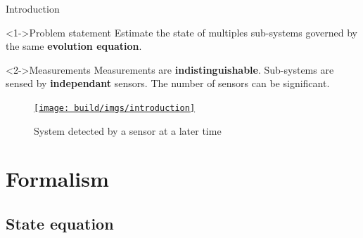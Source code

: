 \documentclass{beamer}
\begin{document}
            \begin{frame}{Introduction}
                \begin{minipage}{0.55\textwidth}
                    \begin{block}<1->{Problem statement}
                        Estimate the state of multiples sub-systems governed by the same \textbf{evolution equation}.
                    \end{block}
                    \begin{block}<2->{Measurements}
                        Measurements are \textbf{indistinguishable}. Sub-systems are sensed by \textbf{independant} sensors. The number of sensors can be significant.
                    \end{block}
                \end{minipage}
                \hfill
                \begin{minipage}{0.4\textwidth}
                    \begin{overprint}
                            \begin{figure}
                                \href{run:introduction.mp4?autostart&loop}{\texttt{[image: build/imgs/introduction]}}
                                \caption{System detected by a sensor at a later time}
                            \end{figure}
                    \end{overprint}
                \end{minipage}
            \end{frame}

        

    \section{Formalism}

        \subsection{State equation}
\end{document}
